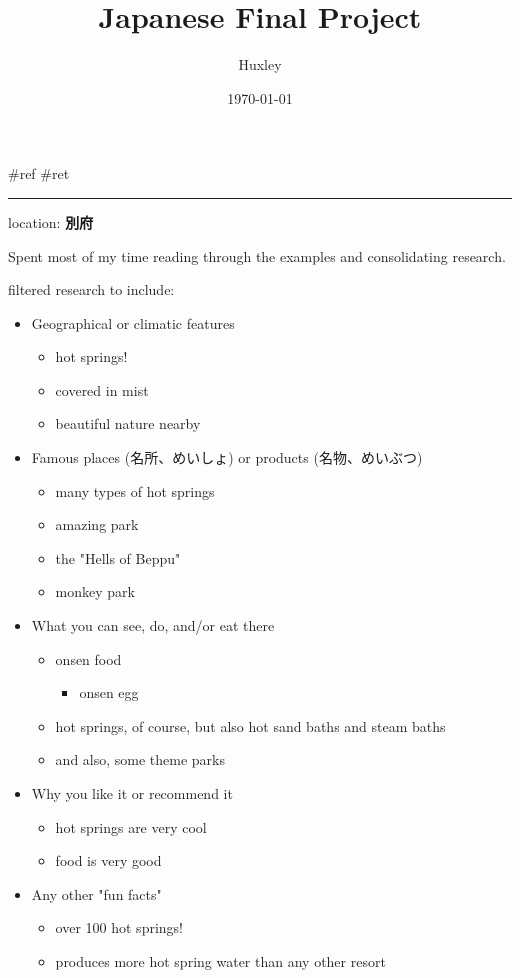 \documentclass[letterpaper]{article}
\author{Huxley}
\date{\today}
\title{Japanese Final Project}
\renewcommand{\tableofcontents}{}
\begin{document}
\tableofcontents

\#ref \#ret

\noindent\rule{\textwidth}{0.5pt}

location: \textbf{別府}

Spent most of my time reading through the examples and consolidating
research.

filtered research to include:

\begin{itemize}
\item Geographical or climatic features

\begin{itemize}
\item hot springs!
\item covered in mist
\item beautiful nature nearby
\end{itemize}

\item Famous places (名所、めいしょ) or products (名物、めいぶつ)

\begin{itemize}
\item many types of hot springs
\item amazing park
\item the "Hells of Beppu"
\item monkey park
\end{itemize}

\item What you can see, do, and/or eat there

\begin{itemize}
\item onsen food

\begin{itemize}
\item onsen egg
\end{itemize}

\item hot springs, of course, but also hot sand baths and steam baths
\item and also, some theme parks
\end{itemize}

\item Why you like it or recommend it

\begin{itemize}
\item hot springs are very cool
\item food is very good
\end{itemize}

\item Any other "fun facts"

\begin{itemize}
\item over 100 hot springs!
\item produces more hot spring water than any other resort
\end{itemize}
\end{itemize}
\end{document}
